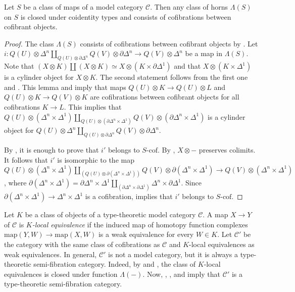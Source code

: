\documentclass[reqno]{amsart}
\theoremstyle{definition}
\theoremstyle{remark}
\newcommand{\fs}[1]{\mathrm{#1}}
\newcommand{\scat}[1]{\mathcal{#1}}
\newcommand{\class}[2]{#1\text{-}\mathrm{#2}}
\newcommand{\I}{\mathrm{I}}
\newcommand{\Icof}[1][\I]{\class{#1}{cof}}
\numberwithin{figure}{section}
\begin{document}
\begin{lem}
Let $S$ be a class of maps of a model category $\scat{C}$.
Then any class of horns $\Lambda(S)$ on $S$ is closed under coidentity types and consists of cofibrations between cofibrant objects.
\end{lem}
\begin{proof}
The class $\Lambda(S)$ consists of cofibrations between cofibrant objects by \cite[Corollary~16.3.11]{hirschhorn}.
Let $i : Q(U) \otimes \Delta^n \amalg_{Q(U) \otimes \partial \Delta^n} Q(V) \otimes \partial \Delta^n \to Q(V) \otimes \Delta^n$ be a map in $\Lambda(S)$.
Note that $(X \otimes K) \amalg (X \otimes K) \simeq X \otimes (K \times \partial \Delta^1)$ and that $X \otimes (K \times \Delta^1)$ is a cylinder object for $X \otimes K$.
The second statement follows from the first one and \cite[Lemma~16.4.4]{hirschhorn}.
This lemma and \cite[Proposition~16.5.6]{hirschhorn} imply that maps $Q(U) \otimes K \to Q(U) \otimes L$ and $Q(U) \otimes K \to Q(V) \otimes K$ are cofibrations between cofibrant objects for all cofibrations $K \to L$.
This implies that $Q(U) \otimes (\Delta^n \times \Delta^1) \amalg_{Q(U) \otimes (\partial \Delta^n \times \Delta^1)} Q(V) \otimes (\partial \Delta^n \times \Delta^1)$ is a cylinder object
for $Q(U) \otimes \Delta^n \amalg_{Q(U) \otimes \partial \Delta^n} Q(V) \otimes \partial \Delta^n$.

By , it is enough to prove that $i'$ belongs to $\Icof[S]$.
By \cite[Proposition~16.4.3]{hirschhorn}, $X \otimes -$ preserves colimits.
It follows that $i'$ is isomorphic to the map $Q(U) \otimes (\Delta^n \times \Delta^1) \amalg_{(Q(U) \otimes \partial(\Delta^n \times \Delta^1))} Q(V) \otimes \partial(\Delta^n \times \Delta^1) \to Q(V) \otimes (\Delta^n \times \Delta^1)$,
where $\partial(\Delta^n \times \Delta^1) = \partial \Delta^n \times \Delta^1 \amalg_{(\partial \Delta^n \times \partial \Delta^1)} \Delta^n \times \partial \Delta^1$.
Since $\partial(\Delta^n \times \Delta^1) \to \Delta^n \times \Delta^1$ is a cofibration, \cite[Proposition~16.4.5]{hirschhorn} implies that $i'$ belongs to $\Icof[S]$.
\end{proof}

\begin{remark}
Let $K$ be a class of objects of a type-theoretic model category $\scat{C}$.
A map $X \to Y$ of $\scat{C}$ is \emph{$K$-local equivalence} if the induced map of homotopy function complexes $\fs{map}(Y,W) \to \fs{map}(X,W)$ is a weak equivalence for every $W \in K$.
Let $\scat{C}'$ be the category with the same class of cofibrations as $\scat{C}$ and $K$-local equivalences as weak equivalences.
In general, $\scat{C}'$ is not a model category, but it is always a type-theoretic semi-fibration category.
Indeed, by \cite[Proposition~17.8.5]{hirschhorn} and \cite[Proposition~17.8.14]{hirschhorn}, the class of $K$-local equivalences is closed under function $\Lambda(-)$.
Now, , , and  imply that $\scat{C}'$ is a type-theoretic semi-fibration category.
\end{remark}
\end{document}
